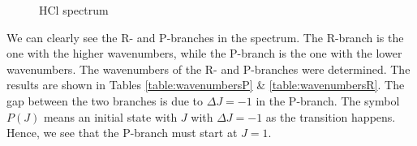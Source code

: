 \documentclass{article}
\begin{document}
\begin{figure}[h!]
	\centering
	
	\caption{HCl spectrum}
	\label{fig:HCl}
\end{figure}

We can clearly see the R- and P-branches in the spectrum. The R-branch is the one with the higher wavenumbers, while the P-branch is the one with the lower wavenumbers. The wavenumbers of the R- and P-branches were determined. The results are shown in Tables \ref{table:wavenumbersP} \& \ref{table:wavenumbersR}. The gap between the two branches is due to $\Delta J = -1$ in the P-branch. The symbol $P(J)$ means an initial state with $J$ with $\Delta J = -1$ as the transition happens. Hence, we see that the P-branch must start at $J = 1$. 

\begin{table}[h!]
    \centering
    \begin{minipage}{0.47\textwidth}
        \centering
        \caption{P-branch wavenumbers}
        \label{table:wavenumbersP}
    \end{minipage}%
    \hfill
    \begin{minipage}{0.47\textwidth}
        \centering
\end{minipage}
\end{table}
\end{document}
